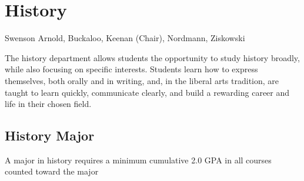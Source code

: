 \documentclass[
  letterpaper,
]{scrbook}
\begin{document}
\section{History}\label{history}

Swenson Arnold, Buckaloo, Keenan (Chair), Nordmann, Ziskowski

The history department allows students the opportunity to study history
broadly, while also focusing on specific interests. Students learn how
to express themselves, both orally and in writing, and, in the liberal
arts tradition, are taught to learn quickly, communicate clearly, and
build a rewarding career and life in their chosen field.

\subsection{History Major}\label{history-major}

A major in history requires a minimum cumulative 2.0 GPA in all courses
counted toward the major
\end{document}
